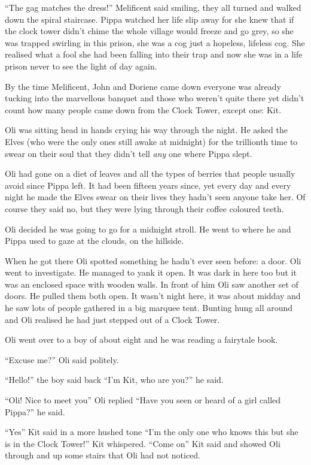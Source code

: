 ``The gag matches the dress!'' Melificent said smiling, they all turned
and walked down the spiral staircase. Pippa watched her life slip away
for she knew that if the clock tower didn't chime the whole village
would freeze and go grey, so she was trapped swirling in this prison,
she was a cog just a hopeless, lifeless cog. She realised what a fool
she had been falling into their trap and now she was in a life prison
never to see the light of day again.

By the time Melificent, John and Doriene came down everyone was already
tucking into the marvellous banquet and those who weren't quite there
yet didn't count how many people came down from the Clock Tower, except
one: Kit.

Oli was sitting head in hands crying his way through the night. He asked
the Elves (who were the only ones still awake at midnight) for the
trillionth time to swear on their soul that they didn't tell \emph{any}
one where Pippa slept.

Oli had gone on a diet of leaves and all the types of berries that
people usually avoid since Pippa left. It had been fifteen years since,
yet every day and every night he made the Elves swear on their lives
they hadn't seen anyone take her. Of course they said no, but they were
lying through their coffee coloured teeth.

Oli decided he was going to go for a midnight stroll. He went to where
he and Pippa used to gaze at the clouds, on the hillside.

When he got there Oli spotted something he hadn't ever seen before: a
door. Oli went to investigate. He managed to yank it open. It was dark
in here too but it was an enclosed space with wooden walls. In front of
him Oli saw another set of doors. He pulled them both open. It wasn't
night here, it was about midday and he saw lots of people gathered in a
big marquee tent. Bunting hung all around and Oli realised he had just
stepped out of a Clock Tower.

Oli went over to a boy of about eight and he was reading a fairytale
book.

``Excuse me?'' Oli said politely.

``Hello!'' the boy said back ``I'm Kit, who are you?'' he said.

``Oli! Nice to meet you'' Oli replied ``Have you seen or heard of a girl
called Pippa?'' he said.

``Yes'' Kit said in a more hushed tone ``I'm the only one who knows this
but she is in the Clock Tower!'' Kit whispered. ``Come on'' Kit said and
showed Oli through and up some stairs that Oli had not noticed.

